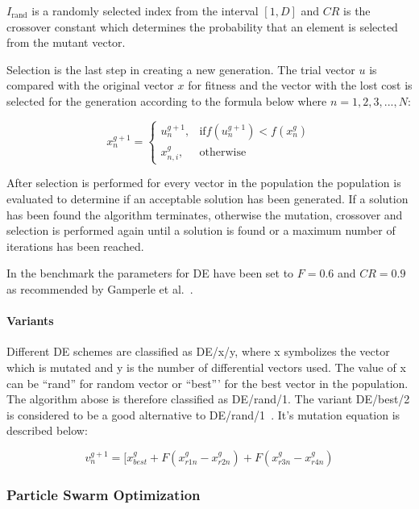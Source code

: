 $I_{\text{rand}}$ is a randomly selected index from the interval $[1,D]$ and $CR$ is the crossover constant which determines the probability that an element is selected from the mutant vector.

Selection is the last step in creating a new generation. The trial vector $u$ is compared with the original vector $x$ for fitness and the vector with the lost cost is selected for the generation according to the formula below where $n=1,2,3,...,N$:

\begin{equation}
    x_{n}^{g+1} =
    \begin{cases}
      u_{n}^{g+1}, & \text{if} f(u_{n}^{g+1}) < f(x_{n}^{g}) \\
      x_{n,i}^{g}, & \text{otherwise}
\end{cases}
\end{equation}

After selection is performed for every vector in the population the population is evaluated to determine if an acceptable solution has been generated. If a solution has been found the algorithm terminates, otherwise the mutation, crossover and selection is performed again until a solution is found or a maximum number of iterations has been reached.

In the benchmark the parameters for DE have been set to $F = 0.6$ and $CR=0.9$ as recommended by Gamperle et al.~\cite{gamperle2002parameter}.

\paragraph{Variants}

Different DE schemes are classified as DE/x/y, where x symbolizes the vector which is mutated and y is the number of differential vectors used. The value of x can be ``rand'' for random vector or ``best''' for the best vector in the population. The algorithm abose is therefore classified as DE/rand/1. The variant DE/best/2 is considered to be a good alternative to DE/rand/1~\cite{qin2009differential}. It's mutation equation is described below:

\begin{equation}
v_{n}^{g+1} = [ x_{best}^{g} + F(x_{r1n}^{g} - x_{r2n}^{g}) + F(x_{r3n}^{g} - x_{r4n}^{g})
\end{equation}

\subsubsection{Particle Swarm Optimization}

